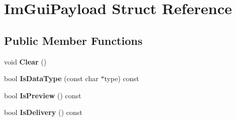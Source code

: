 \hypertarget{structImGuiPayload}{}\section{Im\+Gui\+Payload Struct Reference}
\label{structImGuiPayload}
\subsection*{Public Member Functions}
\begin{DoxyCompactItemize}
\item 
\mbox{\label{structImGuiPayload_a88c2293d356eb05e7a30d7693de186f2}} 
void {\bfseries Clear} ()
\item 
\mbox{\label{structImGuiPayload_a7864aeb80bc28683748d015562eead4d}} 
bool {\bfseries Is\+Data\+Type} (const char $\ast$type) const
\item 
\mbox{\label{structImGuiPayload_a4a7e17de25fd86c5ada447aaec412070}} 
bool {\bfseries Is\+Preview} () const
\item 
\mbox{\label{structImGuiPayload_adcc193e0d454bf394e76e5498eea808d}} 
bool {\bfseries Is\+Delivery} () const
\end{DoxyCompactItemize}
